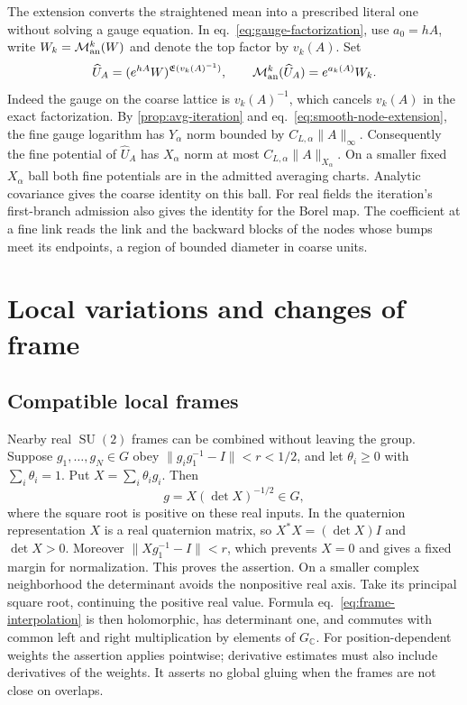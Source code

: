 \documentclass[11pt,letterpaper,reqno]{amsart}
\numberwithin{equation}{section}
\renewcommand{\eqref}[1]{\textup{eq.~\ref{#1}}}
\theoremstyle{definition}
\theoremstyle{remark}
\begin{document}
The extension converts the straightened mean into a prescribed
literal one without solving a gauge equation. In
\eqref{eq:gauge-factorization}, use \(a_0=hA\), write \(W_k=\mathcal M_{\rm an}^k(W)\)
and denote the top factor by \(v_k(A)\). Set
\begin{equation}\label{eq:smooth-literal-representative}
 \widehat U_A=(e^{hA}W)^{\mathfrak E(v_k(A)^{-1})},
 \qquad
 \mathcal M_{\rm an}^k(\widehat U_A)=e^{a_k(A)}W_k.
\end{equation}
Indeed the gauge on the coarse lattice is \(v_k(A)^{-1}\), which
cancels \(v_k(A)\) in the exact factorization. By
\cref{prop:avg-iteration} and \eqref{eq:smooth-node-extension}, the
fine gauge logarithm has \(Y_\alpha\) norm bounded by
\(C_{L,\alpha}\|A\|_\infty\).
Consequently the fine potential of \(\widehat U_A\) has
\(X_\alpha\) norm at most \(C_{L,\alpha}\|A\|_{X_\alpha}\).
On a smaller fixed \(X_\alpha\) ball both fine potentials are in
the admitted averaging charts. Analytic covariance gives the coarse
identity on this ball. For real fields the iteration's first-branch
admission also gives the identity for the Borel map. The coefficient at a fine link reads the
link and the backward blocks of the nodes whose bumps meet its
endpoints, a region of bounded diameter in coarse units.

\section{Local variations and changes of frame}\label{sec:local-variations}

\subsection{Compatible local frames}

Nearby real $\operatorname{SU}(2)$ frames can be combined without
leaving the group. Suppose $g_1,\ldots,g_N\in G$ obey
$\|g_i g_1^{-1}-I\|<r<1/2$, and let $\theta_i\ge0$ with
$\sum_i\theta_i=1$. Put $X=\sum_i\theta_i g_i$. Then
\begin{equation}\label{eq:frame-interpolation}
                 g=X(\det X)^{-1/2}\in G,
\end{equation}
where the square root is positive on these real inputs.
In the quaternion representation $X$ is a real quaternion matrix,
so $X^*X=(\det X)I$ and $\det X>0$. Moreover
$\|Xg_1^{-1}-I\|<r$, which prevents $X=0$ and gives a fixed
margin for normalization. This proves the assertion. On a smaller
complex neighborhood the determinant avoids the nonpositive real axis.
Take its principal square root, continuing the positive real value.
Formula \eqref{eq:frame-interpolation}
is then holomorphic, has determinant one, and commutes with common
left and right multiplication by elements of $G_{\mathbb C}$.
For position-dependent weights the assertion applies pointwise;
derivative estimates must also include derivatives of the weights.
It asserts no global gluing when the frames are not close on overlaps.
\end{document}
